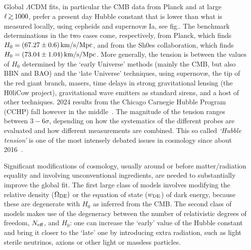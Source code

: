 Global $\Lambda$CDM fits, in particular the CMB data from {\sc Planck} and at large $\ell \circa{>}1000$, 
prefer a present day  Hubble constant that is lower than what is measured locally, using cepheids and supernov\ae{} Ia, see fig..
The benchmark determinations in the two cases come, respectively, from {\sc Planck}, which finds $H_0 = (67.27\pm 0.6) \,{\rm km/s/Mpc}$, and from the {\sc Sh0es} collaboration, which finds $H_0 = (73.04\pm 1.04) \,{\rm km/s/Mpc}$.
More generally, the tension is between the values of $H_0$ determined by the `early Universe' methods (mainly the CMB, but also BBN and BAO) and the `late Universe' techniques, using supernov\ae{}, the tip of the red giant branch, masers, time delays in strong gravitational lensing (the {\sc H0liCow} project), gravitational wave emitters as standard sirens, and a host of other techniques.
2024 results from the Chicago Carnegie Hubble Program (CCHP) fall however in the middle~\cite{H0tension}.
The magnitude of the tension ranges between $3-6\sigma$, depending on how the systematics of the different probes are evaluated and how different measurements are combined. This so called {\em `Hubble tension'} is one of the most intensely debated issues in cosmology since about 2016~\cite{H0tension}. 


\medskip

Significant modifications of cosmology, usually around or before matter/radiation equality and involving unconventional ingredients, are needed to substantially improve the global fit. 
The first large class of models involves modifying the relative density ($\Omega_{\rm DE})$ or the equation of state ($w_{\rm DE}$) of dark energy, because these are degenerate with $H_0$ as inferred from the CMB. The second class of models makes use of the degeneracy between the number of relativistic degrees of freedom, $N_{\rm eff}$, and $H_0$: one can increase the `early' value of the Hubble constant and bring it closer to the `late' one by introducing extra radiation, such as light sterile neutrinos, axions or other light or massless particles.

\smallskip

